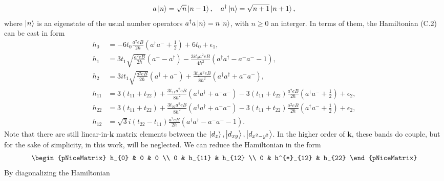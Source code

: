 \documentclass{report}
\begin{document}
\begin{equation}
	\begin{aligned}
		a \ket{n} = \sqrt{n} \ket{n-1} , \quad a^{\dagger} \ket{n} = \sqrt{n+1} \ket{n+1},
	\end{aligned}
\end{equation}
where $\ket{n}$ is an eigenstate of the usual number operators $a^{\dagger} a \ket{n} = n\ket{n}$, with $n \geq 0$ an interger. In terms of them, the Hamiltonian (C.2) can be cast in form
\begin{equation}
	\begin{aligned}
		h_{0}  & = -6t_{0}\tfrac{a^{2}eB}{2\hbar}( a^{\dagger} a^{-} + \tfrac{1}{2}) + 6t_{0} + \epsilon_{1} ,                                                                                                      \\
		h_{1}  & = 3 t_{1} \sqrt{\tfrac{a^{2}eB}{2\hbar}} ( a^{-} - a^{\dagger}) - \tfrac{3 i t_{2} a^{2}eB}{4\hbar^{2}}(a^{\dagger} a^{\dagger} - a^{-}a^{-} - 1),                                                 \\
		h_{2}  & = 3 i t_{1} \sqrt{\tfrac{a^{2}eB}{2\hbar}} (a^{\dagger} + a^{-}) + \tfrac{3t_{2} a^{2}eB}{8\hbar^{2}}(a^{\dagger} a^{\dagger} + a^{-} a^{-}),                                                      \\
		h_{11} & =	3 (t_{11} + t_{22}) + \tfrac{3t_{11}a^{2}eB}{8\hbar^{2}}( a^{\dagger}a^{\dagger} + a^{-} a^{-} ) - 3 (t_{11} + t_{22})\tfrac{a^{2}eB}{2\hbar} (a^{\dagger} a^{-} + \tfrac{1}{2}) + \epsilon_{2}, \\
		h_{22} & =	3 (t_{11} + t_{22}) + \tfrac{3t_{22}a^{2}eB}{8\hbar^{2}}( a^{\dagger}a^{\dagger} + a^{-} a^{-} ) - 3 (t_{11} + t_{22})\tfrac{a^{2}eB}{2\hbar} (a^{\dagger} a^{-} + \tfrac{1}{2}) + \epsilon_{2}, \\
		h_{12} & = \sqrt{3}i (t_{22} - t_{11})\tfrac{a^{2}eB}{2\hbar} (a^{\dagger} a^{\dagger} - a^{-} a^{-} - 1) .
	\end{aligned}
\end{equation}
Note that there are still linear-in-$\mathbf{k}$ matrix elements between the $\ket{d_{z}},\ket{d_{xy}},\ket{d_{x^{2} - y^{2}}}$. In the higher order of $\mathbf{k}$, these bands do couple, but for the sake of simplicity, in this work, will be neglected. We can reduce the Hamiltonian in the form
\begin{equation}
	\begin{aligned}
		\begin{pNiceMatrix}
			h_{0} & 0          & 0      \\
			0     & h_{11}     & h_{12} \\
			0     & h^{*}_{12} & h_{22}
		\end{pNiceMatrix}
	\end{aligned}
\end{equation}
By diagonalizing the Hamiltonian
\end{document}
